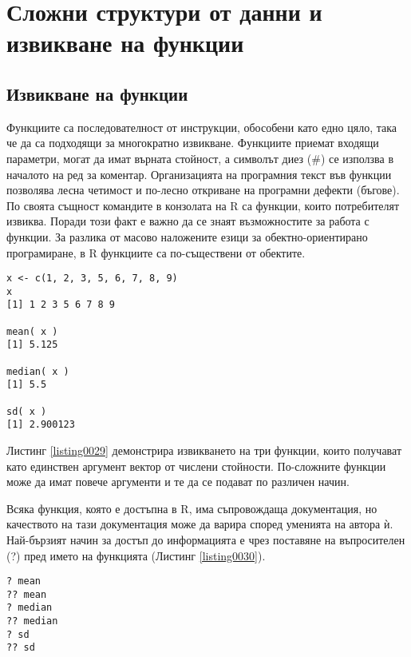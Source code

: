 \newpage
\chapter{Сложни структури от данни и извикване на функции}
\label{chapter03}
\thispagestyle{empty}

\section{Извикване на функции}

Функциите са последователност от инструкции, обособени като едно цяло, така че да са подходящи за многократно извикване. Функциите приемат входящи параметри, могат да имат върната стойност, а символът диез (\#) се използва в началото на ред за коментар. Организацията на програмния текст във функции позволява лесна четимост и по-лесно откриване на програмни дефекти (бъгове). По своята същност командите в конзолата на R са функции, които потребителят извиква. Поради този факт е важно да се знаят възможностите за работа с функции. За разлика от масово наложените езици за обектно-ориентирано програмиране, в R функциите са по-съществени от обектите.

\begin{lstlisting}[caption=Извикване на функции, label=listing0029]
x <- c(1, 2, 3, 5, 6, 7, 8, 9)
x
[1] 1 2 3 5 6 7 8 9

mean( x )
[1] 5.125

median( x )
[1] 5.5

sd( x )
[1] 2.900123
\end{lstlisting}

Листинг \ref{listing0029} демонстрира извикването на три функции, които получават като единствен аргумент вектор от числени стойности. По-сложните функции може да имат повече аргументи и те да се подават по различен начин.

Всяка функция, която е достъпна в R, има съпровождаща документация, но качеството на тази документация може да варира според уменията на автора ѝ. Най-бързият начин за достъп до информацията е чрез поставяне на въпросителен (?) пред името на функцията (Листинг \ref{listing0030}).

\begin{lstlisting}[caption=Документация за функциите, label=listing0030]
? mean
?? mean
? median
?? median
? sd
?? sd
\end{lstlisting}

